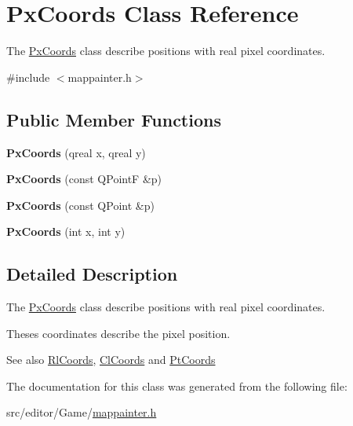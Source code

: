 \hypertarget{class_px_coords}{\section{\-Px\-Coords \-Class \-Reference}
\label{class_px_coords}
}


\-The \hyperlink{class_px_coords}{\-Px\-Coords} class describe positions with real pixel coordinates.  




{\ttfamily \#include $<$mappainter.\-h$>$}

\subsection*{\-Public \-Member \-Functions}
\begin{DoxyCompactItemize}
\item 
\hypertarget{class_px_coords_af7f17b5bb6fa3261162b4fb5df854236}{{\bfseries \-Px\-Coords} (qreal x, qreal y)}\label{class_px_coords_af7f17b5bb6fa3261162b4fb5df854236}

\item 
\hypertarget{class_px_coords_a589dea0fc7f89609399528ce47788b74}{{\bfseries \-Px\-Coords} (const \-Q\-Point\-F \&p)}\label{class_px_coords_a589dea0fc7f89609399528ce47788b74}

\item 
\hypertarget{class_px_coords_ad38e146a7d9908ac31ddae47a1b765ff}{{\bfseries \-Px\-Coords} (const \-Q\-Point \&p)}\label{class_px_coords_ad38e146a7d9908ac31ddae47a1b765ff}

\item 
\hypertarget{class_px_coords_a258b2927d40dc866bfbdd0d02a0afa31}{{\bfseries \-Px\-Coords} (int x, int y)}\label{class_px_coords_a258b2927d40dc866bfbdd0d02a0afa31}

\end{DoxyCompactItemize}


\subsection{\-Detailed \-Description}
\-The \hyperlink{class_px_coords}{\-Px\-Coords} class describe positions with real pixel coordinates. 

\-Theses coordinates describe the pixel position.

\-See also \hyperlink{class_rl_coords}{\-Rl\-Coords}, \hyperlink{class_cl_coords}{\-Cl\-Coords} and \hyperlink{class_pt_coords}{\-Pt\-Coords} 

\-The documentation for this class was generated from the following file\-:\begin{DoxyCompactItemize}
\item 
src/editor/\-Game/\hyperlink{mappainter_8h}{mappainter.\-h}\end{DoxyCompactItemize}
